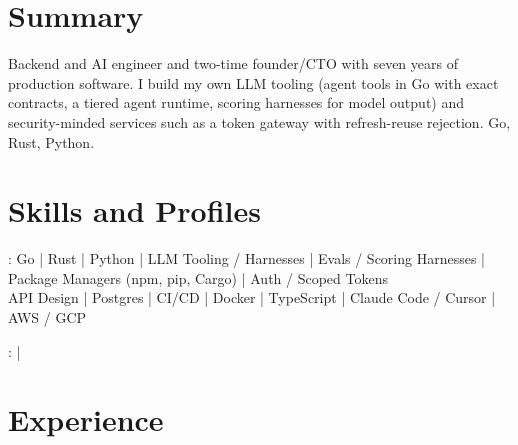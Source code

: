 \documentclass[print]{jack-resume}
\begin{document}
\pagecolor{darkmodeBackground}


\begin{minipage}[t][1cm][t]{.03\textwidth}
    \hfill
\end{minipage}

\section{Summary}
Backend and AI engineer and two-time founder/CTO with seven years of production software. I build my own LLM tooling (agent tools in Go with exact contracts, a tiered agent runtime, scoring harnesses for model output) and security-minded services such as a token gateway with refresh-reuse rejection. Go, Rust, Python.
\sectionsep

\section{Skills and Profiles}
:
Go \hfill | \hfill
Rust \hfill | \hfill
Python \hfill | \hfill
LLM Tooling / Harnesses \hfill | \hfill
Evals / Scoring Harnesses \hfill | \hfill
Package Managers (npm, pip, Cargo) \hfill | \hfill
Auth / Scoped Tokens \\
\hspace{1.0cm} API Design \hfill | \hfill
Postgres \hfill | \hfill
CI/CD \hfill | \hfill
Docker \hfill | \hfill
TypeScript \hfill | \hfill
Claude Code / Cursor \hfill | \hfill
AWS / GCP \\

\raggedright{
    :
      \href{https://www.linkedin.com/in/jack-sturtevant/}{ \ExternalLink} |
     \href{https://github.com/jacksturt}{ \ExternalLink}}

\section{Experience}
\end{document}
